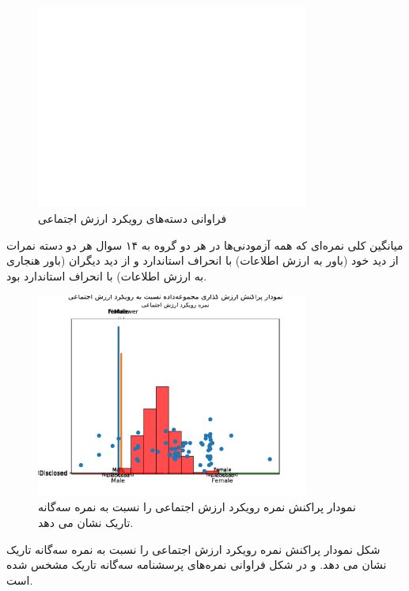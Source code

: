 \begin{figure}[htpb]
    \centering
    \includegraphics[width=0.8\textwidth]{./img/SVOAgainstPopulation.pdf}
    \caption{فراوانی دسته‌های رویکرد ارزش اجتماعی}
    \label{fig:SVOAgainstPopulation}
\end{figure}
میانگین کلی نمره‌ای که همه آزمودنی‌ها در هر دو گروه به ۱۴ سوال هر دو دسته
نمرات از دید خود
\!(باور به ارزش اطلاعات)
\meanOfSelfWTPAllTwoParticipantGroupsAllTwoQuestionSection
با انحراف استاندارد
\SDOfSelfWTPAllTwoParticipantGroupsAllTwoQuestionSection
و از دید دیگران
\meanOfOtherWTPAllTwoParticipantGroupsAllTwoQuestionSection
\!(باور هنجاری به ارزش اطلاعات)
با انحراف استاندارد
\SDOfOtherWTPAllTwoParticipantGroupsAllTwoQuestionSection
بود.

\begin{figure}[htpb]
    \centering
    \includegraphics[width=0.8\textwidth]{./img/ScatterSVOScoreDarkTriadScore.pdf}
    \caption{نمودار پراکنش نمره رویکرد ارزش اجتماعی را نسبت به نمره سه‌گانه تاریک نشان می دهد. }
    \label{fig:ScatterSVOScoreDarkTriadScore}
\end{figure}
شکل
\label{fig:sexualityAndSVOAgainstPopulation}
نمودار پراکنش نمره رویکرد ارزش اجتماعی را نسبت به نمره سه‌گانه تاریک نشان می دهد.
و در شکل
\label{fig:SexToDTR}
فراوانی نمره‌های پرسشنامه سه‌گانه تاریک مشخس شده است.



